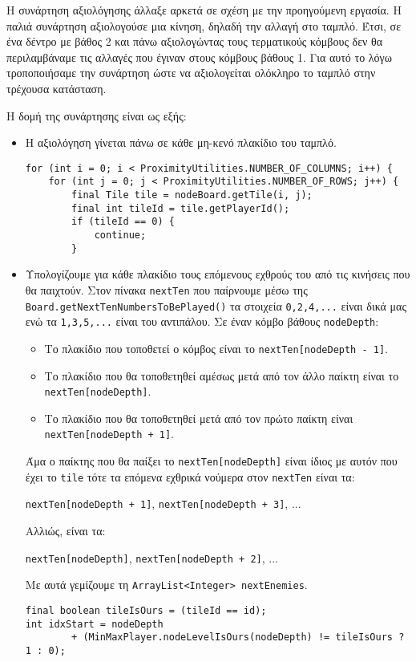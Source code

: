 Η συνάρτηση αξιολόγησης άλλαξε αρκετά σε σχέση με την προηγούμενη εργασία.
Η παλιά συνάρτηση αξιολογούσε μια κίνηση, δηλαδή την αλλαγή στο ταμπλό.
Έτσι, σε ένα δέντρο με βάθος 2 και πάνω αξιολογώντας τους τερματικούς κόμβους δεν θα περιλαμβάναμε τις αλλαγές που έγιναν στους κόμβους βάθους 1.
Για αυτό το λόγω τροποποιήσαμε την συνάρτηση ώστε να αξιολογείται ολόκληρο το ταμπλό στην τρέχουσα κατάσταση.

Η δομή της συνάρτησης είναι ως εξής:
\begin{itemize}
\item Η αξιολόγηση γίνεται πάνω σε κάθε μη-κενό πλακίδιο του ταμπλό.
\begin{lstlisting}[style=chunk]
for (int i = 0; i < ProximityUtilities.NUMBER_OF_COLUMNS; i++) {
    for (int j = 0; j < ProximityUtilities.NUMBER_OF_ROWS; j++) {
        final Tile tile = nodeBoard.getTile(i, j);
        final int tileId = tile.getPlayerId();
        if (tileId == 0) {
            continue;
        }
\end{lstlisting}

\item \label{item:nextEnemies} \sloppy
Υπολογίζουμε για κάθε πλακίδιο τους επόμενους εχθρούς του από τις κινήσεις που θα παιχτούν.
Στον πίνακα \lstinline!nextTen! που παίρνουμε μέσω της \lstinline!Board.getNextTenNumbersToBePlayed()!
τα στοιχεία \lstinline!0,2,4,...! είναι δικά μας ενώ τα \lstinline!1,3,5,...! είναι του αντιπάλου.
Σε έναν κόμβο βάθους \lstinline!nodeDepth!:
\begin{itemize}
\item Το πλακίδιο που τοποθετεί ο κόμβος είναι το
\lstinline!nextTen[nodeDepth - 1]!.

\item Το πλακίδιο που θα τοποθετηθεί αμέσως μετά από τον άλλο παίκτη είναι το
\lstinline!nextTen[nodeDepth]!.

\item Το πλακίδιο που θα τοποθετηθεί μετά από τον πρώτο παίκτη είναι
\lstinline!nextTen[nodeDepth + 1]!.
\end{itemize}

Άμα ο παίκτης που θα παίξει το \lstinline!nextTen[nodeDepth]! είναι ίδιος με αυτόν που έχει το \lstinline!tile! τότε
τα επόμενα εχθρικά νούμερα στον \lstinline!nextTen! είναι τα:
\begin{center}
\lstinline!nextTen[nodeDepth + 1]!, \lstinline!nextTen[nodeDepth + 3]!, ...
\end{center}
Αλλιώς, είναι τα:
\begin{center}
\lstinline!nextTen[nodeDepth]!, \lstinline!nextTen[nodeDepth + 2]!, ...
\end{center}
Με αυτά γεμίζουμε τη \lstinline!ArrayList<Integer> nextEnemies!.
\begin{lstlisting}[style=chunk]
final boolean tileIsOurs = (tileId == id);
int idxStart = nodeDepth
        + (MinMaxPlayer.nodeLevelIsOurs(nodeDepth) != tileIsOurs ? 1 : 0);


\end{lstlisting}
\end{itemize}

